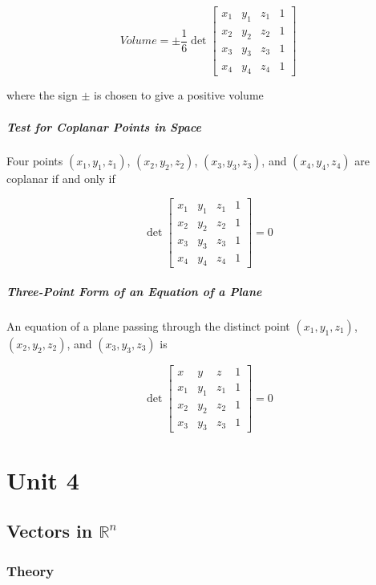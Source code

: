 \documentclass{report}
\begin{document}
\[
Volume
=
\pm
\frac{1}{6}
\det{
\begin{bmatrix}
    x_1 & y_1 & z_1 & 1 \\
    x_2 & y_2 & z_2 & 1 \\
    x_3 & y_3 & z_3 & 1 \\
    x_4 & y_4 & z_4 & 1 
\end{bmatrix}
}
\]

\noindent where the sign $\pm$ is chosen to give a positive volume\\

\paragraph{Test for Coplanar Points in Space} Four points $(x_1,y_1,z_1)$, $(x_2,y_2,z_2)$, $(x_3,y_3,z_3)$, and $(x_4,y_4,z_4)$ are coplanar if and only if

\[
\det
{
\begin{bmatrix}
    x_1 & y_1 & z_1 & 1 \\
    x_2 & y_2 & z_2 & 1 \\
    x_3 & y_3 & z_3 & 1 \\
    x_4 & y_4 & z_4 & 1 
\end{bmatrix}
}
=
0
\]

\paragraph{Three-Point Form of an Equation of a Plane} An equation of a plane passing through the distinct point $(x_1,y_1,z_1)$, $(x_2,y_2,z_2)$, and $(x_3,y_3,z_3)$ is

\[
\det{
\begin{bmatrix}
x & y & z & 1 \\
x_1 & y_1 & z_1 & 1 \\
x_2 & y_2 & z_2 & 1 \\
x_3 & y_3 & z_3 & 1 
\end{bmatrix}
=
0
}
\]

\chapter{Unit 4}

\section{Vectors in $\mathbb{R}^n$}

\subsection{Theory}
\end{document}
